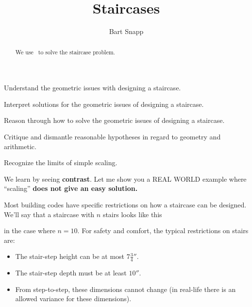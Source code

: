 \documentclass[noauthor,nooutcomes,handout]{../ximera}
\title{Staircases}
\author{Bart Snapp}
\begin{document}
\begin{abstract}
  We use \snap\ to solve the staircase problem.
\end{abstract}
\maketitle

\begin{listOutcomes}
\item{Understand the geometric issues with designing a staircase.}
\item{Interpret solutions for the geometric issues of designing a staircase.}
\item{Reason through how to solve the geometric issues of designing a staircase.}
\item{Critique and dismantle reasonable hypotheses in regard to geometry and arithmetic.}
\item{Recognize the limits of simple scaling.}
\end{listOutcomes}

We learn by seeing \textbf{contrast}. Let me show you a REAL WORLD
example where ``scaling'' \textbf{does not give an easy solution.}


Most building codes have specific restrictions on how a staircase can
be designed. We'll say that a staircase with $n$ stairs looks like
this
\begin{center}
\end{center}
in the case where $n=10$. For safety and comfort, the typical
restrictions on stairs are:
\begin{itemize}
\item The stair-step height can be at most $7\frac{3}{4}''$. 
\item The stair-step depth must be at least $10''$.
\item From step-to-step, these dimensions cannot change (in real-life there is
an allowed variance for these dimensions).
\end{itemize}
\end{document}
